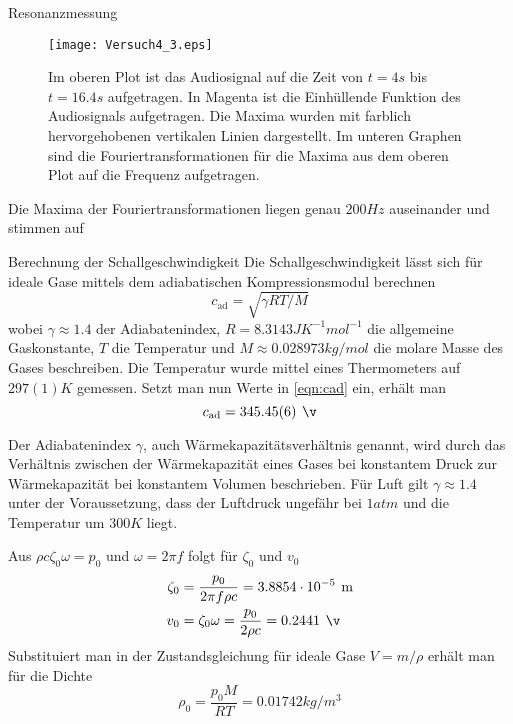 \documentclass{alex_gp}
\begin{document}
\begin{mybox}{Resonanzmessung}
	\begin{figure}[H]	
		\centering
		\texttt{[image: Versuch4\_3.eps]}
		\caption{Im oberen Plot ist das Audiosignal auf die Zeit von \( t = 4 \unit{s} \) bis \( t = 16.4 \unit{s} \) aufgetragen. In Magenta ist die Einhüllende Funktion des Audiosignals aufgetragen. Die Maxima wurden mit farblich hervorgehobenen vertikalen Linien dargestellt. Im unteren Graphen sind die Fouriertransformationen für die Maxima aus dem oberen Plot auf die Frequenz aufgetragen.}
		\label{fig:fft}
	\end{figure}

	Die Maxima der Fouriertransformationen liegen genau \( 200 \unit{Hz} \) auseinander und stimmen auf 	
\end{mybox}

\begin{mybox}{Berechnung der Schallgeschwindigkeit}
	Die Schallgeschwindigkeit lässt sich für ideale Gase mittels dem adiabatischen Kompressionsmodul berechnen 
	\begin{equation}\label{eqn:cad}
		c_{\text{ad}} = \sqrt{\gamma RT/M}
	\end{equation}
	wobei \( \gamma \approx 1.4 \) der Adiabatenindex, \( R = 8.3143 \unit{J K^{-1} mol^{-1}} \) die allgemeine Gaskonstante, \( T \) die Temperatur und \( M \approx 0.028973 \unit{kg/mol} \) die molare Masse des Gases beschreiben.
	Die Temperatur wurde mittel eines Thermometers auf \( 297(1) \unit{K} \) gemessen. 
	Setzt man nun Werte in \autoref{eqn:cad} ein, erhält man 
	\begin{equation}\label{eqn:cad2}
		c_{\text{ad}} = 345.45(6) \unit{\v}
	\end{equation}
	
	
	
	Der Adiabatenindex \( \gamma \), auch Wärmekapazitätsverhältnis genannt, wird durch das Verhältnis zwischen der Wärmekapazität eines Gases bei konstantem Druck zur Wärmekapazität bei konstantem Volumen beschrieben. 
	Für Luft gilt \( \gamma \approx 1.4 \) unter der Voraussetzung, dass der Luftdruck ungefähr bei \( 1 \unit{atm} \) und die Temperatur um \( 300 \unit{K} \) liegt.
	
	Aus \( 	\rho c \zeta_0 \omega = p_0 \) und \( \omega = 2\pi f \) folgt für \( \zeta_0 \) und \( v_0 \)
	\begin{align}\label{eqn:zeta}
		\zeta_0 &= \frac{p_0}{2\pi f\rho c} = 3.8854 \cdot 10^{-5} \unit{m} \\
		v_0 &= \zeta_0\omega = \frac{p_0}{2\rho c} = 0.2441 \unit{\v}
	\end{align}
	Substituiert man in der Zustandsgleichung für ideale Gase \( V = m/\rho \) erhält man für die Dichte
	\begin{equation}\label{eqn:density}
		\rho_0 = \frac{p_0M}{RT} = 0.01742 \unit{kg/m^3}
	\end{equation}
\end{mybox}
\end{document}
